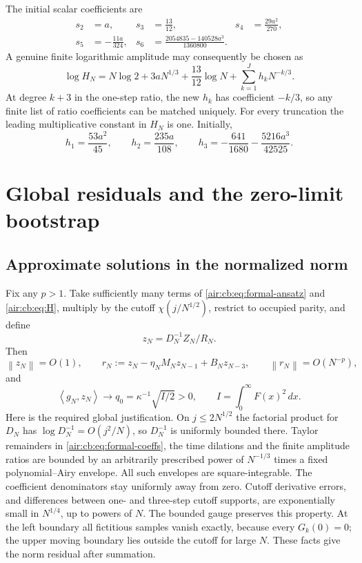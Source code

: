 \documentclass[11pt,letterpaper]{article}
\numberwithin{equation}{section}
\theoremstyle{remark}
\newcommand{\norm}[1]{\left\lVert#1\right\rVert}
\newcommand{\ip}[2]{\left\langle#1,#2\right\rangle}
\begin{document}
The initial scalar coefficients are
\begin{equation}\label{air:cb:eq:ratio-coefficients}
\begin{aligned}
s_2&=a,& s_3&=\frac{13}{12},& s_4&=\frac{29a^2}{270},\\
s_5&=-\frac{11a}{324},&
s_6&=\frac{2054835-140528a^3}{1360800}.
\end{aligned}
\end{equation}
A genuine finite logarithmic amplitude may consequently be chosen as
\begin{equation}\label{air:cb:eq:H}
\log H_N=N\log2+3aN^{1/3}+\frac{13}{12}\log N
+\sum_{k=1}^{J}h_kN^{-k/3}.
\end{equation}
At degree $k+3$ in the one-step ratio, the new $h_k$ has coefficient $-k/3$,
so any finite list of ratio coefficients can be matched uniquely. For every
truncation the leading multiplicative constant in $H_N$ is one. Initially,
\begin{equation}\label{air:cb:eq:h-coefficients}
h_1=\frac{53a^2}{45},\qquad h_2=\frac{235a}{108},\qquad
h_3=-\frac{641}{1680}-\frac{5216a^3}{42525}.
\end{equation}

\section{Global residuals and the zero-limit bootstrap}

\subsection{Approximate solutions in the normalized norm}
Fix any $p>1$. Take sufficiently many terms of \eqref{air:cb:eq:formal-ansatz} and
\eqref{air:cb:eq:H}, multiply by the cutoff $\chi(j/N^{1/2})$, restrict to occupied
parity, and define
\[
z_N=D_N^{-1}Z_N/R_N.
\]
Then
\begin{equation}\label{air:cb:eq:residual}
\norm{z_N}=O(1),\qquad
r_N:=z_N-\eta_NM_Nz_{N-1}+B_Nz_{N-3},\qquad
\norm{r_N}=O(N^{-p}),
\end{equation}
and
\begin{equation}\label{air:cb:eq:q0}
\ip{g_N}{z_N}\longrightarrow q_0=\kappa^{-1}\sqrt{I/2}>0,\qquad
I=\int_0^\infty F(x)^2\,dx.
\end{equation}
Here is the required global justification. On $j\le2N^{1/2}$ the factorial
product for $D_N$ has $\log D_N^{-1}=O(j^2/N)$, so $D_N^{-1}$ is uniformly
bounded there. Taylor remainders in \eqref{air:cb:eq:formal-coeffs}, the time
dilations and the finite amplitude ratios are bounded by an arbitrarily
prescribed power of $N^{-1/3}$ times a fixed polynomial--Airy envelope.
All such envelopes are square-integrable. The coefficient denominators
stay uniformly away from zero. Cutoff derivative errors, and differences
between one- and three-step cutoff supports, are exponentially small in
$N^{1/4}$, up to powers of $N$. The bounded gauge preserves this property.
At the left boundary all fictitious samples vanish exactly, because every
$G_k(0)=0$; the upper moving boundary lies outside the cutoff for large $N$.
These facts give the norm residual after summation.
\end{document}
